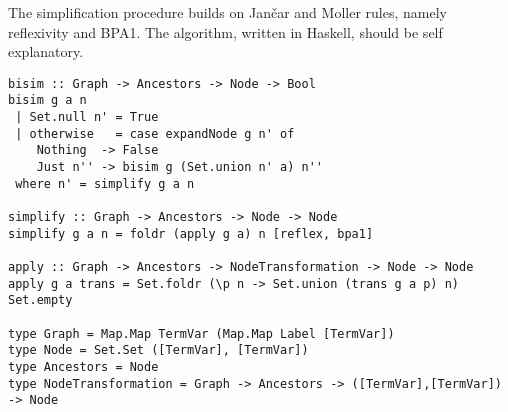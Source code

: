 The simplification procedure builds on  Jan{\v{c}}ar and
Moller rules, namely reflexivity and BPA1.
%
The algorithm, written in Haskell, should be self explanatory.
%
\begin{lstlisting}
bisim :: Graph -> Ancestors -> Node -> Bool
bisim g a n
 | Set.null n' = True
 | otherwise   = case expandNode g n' of
    Nothing  -> False
    Just n'' -> bisim g (Set.union n' a) n''
 where n' = simplify g a n

simplify :: Graph -> Ancestors -> Node -> Node
simplify g a n = foldr (apply g a) n [reflex, bpa1]

apply :: Graph -> Ancestors -> NodeTransformation -> Node -> Node
apply g a trans = Set.foldr (\p n -> Set.union (trans g a p) n) Set.empty

type Graph = Map.Map TermVar (Map.Map Label [TermVar])
type Node = Set.Set ([TermVar], [TermVar])
type Ancestors = Node
type NodeTransformation = Graph -> Ancestors -> ([TermVar],[TermVar]) -> Node
\end{lstlisting}


